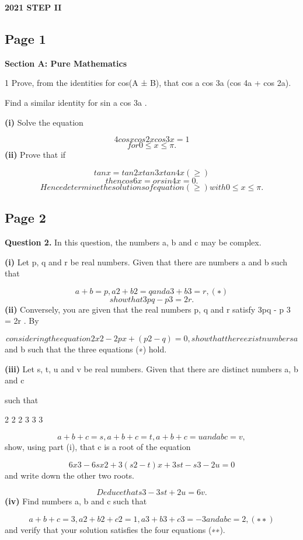 \documentclass[12pt]{article}
\begin{document}
\begin{center}
{\Large \textbf{2021 STEP II}}
\end{center}

\subsection*{Page 1}
\begin{flushleft}
\bigskip\textbf{Section A: Pure Mathematics}\par
1 Prove, from the identities for cos(A ± B), that cos a cos 3a  (cos 4a + cos 2a).\par
Find a similar identity for sin a cos 3a .\par
\textbf{(i)} Solve the equation\par
\[4 cos x cos 2x cos 3x = 1\]
\[for 0 \leq x \leq \pi.\]
\textbf{(ii)} Prove that if\par
\[tan x = tan 2x tan 3x tan 4x (\geq)\]
\[then cos 6x = or sin 4x = 0.\]
\[Hence determine the solutions of equation (\geq) with 0 \leq x \leq \pi.\]
\end{flushleft}
\subsection*{Page 2}
\begin{flushleft}
\bigskip\textbf{Question 2.} In this question, the numbers a, b and c may be complex.\par
\textbf{(i)} Let p, q and r be real numbers. Given that there are numbers a and b such that\par
\[a + b = p , a 2 + b 2 = q and a 3 + b 3 = r , (∗)\]
\[show that 3pq - p 3 = 2r .\]
\textbf{(ii)} Conversely, you are given that the real numbers p, q and r satisfy 3pq - p 3 = 2r . By\par
\[considering the equation 2x 2 - 2px + (p 2 - q) = 0, show that there exist numbers a\]
and b such that the three equations (∗) hold.\par
\textbf{(iii)} Let s, t, u and v be real numbers. Given that there are distinct numbers a, b and c\par
such that\par
2 2 2 3 3 3\par
\[a + b + c = s , a + b + c = t , a + b + c = u and abc = v ,\]
show, using part (i), that c is a root of the equation\par
\[6x 3 - 6sx 2 + 3(s 2 - t)x + 3st - s 3 - 2u = 0\]
and write down the other two roots.\par
\[Deduce that s 3 - 3st + 2u = 6v .\]
\textbf{(iv)} Find numbers a, b and c such that\par
\[a + b + c = 3 , a 2 + b 2 + c 2 = 1 , a 3 + b 3 + c 3 = -3 and abc = 2 , (∗∗)\]
and verify that your solution satisfies the four equations (∗∗).\par
\end{flushleft}
\end{document}
